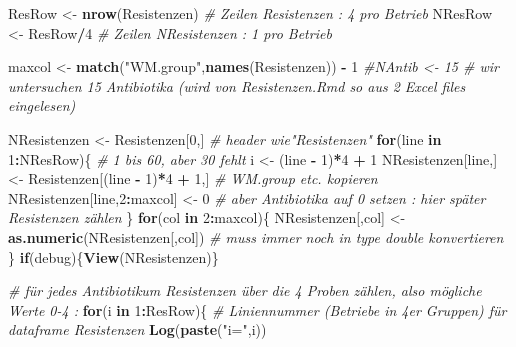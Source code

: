 \documentclass[
]{article}
\newenvironment{Shaded}{\begin{snugshade}}{\end{snugshade}}
\newcommand{\CommentTok}[1]{\textcolor[rgb]{0.56,0.35,0.01}{\textit{#1}}}
\newcommand{\ControlFlowTok}[1]{\textcolor[rgb]{0.13,0.29,0.53}{\textbf{#1}}}
\newcommand{\DecValTok}[1]{\textcolor[rgb]{0.00,0.00,0.81}{#1}}
\newcommand{\KeywordTok}[1]{\textcolor[rgb]{0.13,0.29,0.53}{\textbf{#1}}}
\newcommand{\NormalTok}[1]{#1}
\newcommand{\OperatorTok}[1]{\textcolor[rgb]{0.81,0.36,0.00}{\textbf{#1}}}
\newcommand{\StringTok}[1]{\textcolor[rgb]{0.31,0.60,0.02}{#1}}
\begin{document}
\begin{Shaded}
\begin{Highlighting}[]
\NormalTok{ResRow  <-}\StringTok{ }\KeywordTok{nrow}\NormalTok{(Resistenzen)  }\CommentTok{# Zeilen Resistenzen : 4 pro Betrieb}
\NormalTok{NResRow <-}\StringTok{ }\NormalTok{ResRow}\OperatorTok{/}\DecValTok{4}           \CommentTok{# Zeilen NResistenzen : 1 pro Betrieb}

\NormalTok{maxcol <-}\StringTok{ }\KeywordTok{match}\NormalTok{(}\StringTok{"WM.group"}\NormalTok{,}\KeywordTok{names}\NormalTok{(Resistenzen)) }\OperatorTok{-}\StringTok{ }\DecValTok{1}
\CommentTok{#NAntib  <- 15                 # wir untersuchen 15 Antibiotika (wird von Resistenzen.Rmd so aus 2 Excel files eingelesen)}

\NormalTok{NResistenzen <-}\StringTok{ }\NormalTok{Resistenzen[}\DecValTok{0}\NormalTok{,]                          }\CommentTok{# header wie"Resistenzen"}
\ControlFlowTok{for}\NormalTok{(line }\ControlFlowTok{in} \DecValTok{1}\OperatorTok{:}\NormalTok{NResRow)\{                                  }\CommentTok{# 1 bis 60, aber 30 fehlt}
\NormalTok{  i <-}\StringTok{ }\NormalTok{(line }\OperatorTok{-}\StringTok{ }\DecValTok{1}\NormalTok{)}\OperatorTok{*}\DecValTok{4} \OperatorTok{+}\StringTok{ }\DecValTok{1}
\NormalTok{  NResistenzen[line,] <-}\StringTok{ }\NormalTok{Resistenzen[(line }\OperatorTok{-}\StringTok{ }\DecValTok{1}\NormalTok{)}\OperatorTok{*}\DecValTok{4} \OperatorTok{+}\StringTok{ }\DecValTok{1}\NormalTok{,]  }\CommentTok{# WM.group etc. kopieren}
\NormalTok{  NResistenzen[line,}\DecValTok{2}\OperatorTok{:}\NormalTok{maxcol] <-}\StringTok{ }\DecValTok{0}                       \CommentTok{# aber Antibiotika auf 0 setzen : hier später Resistenzen zählen}
\NormalTok{\}}
\ControlFlowTok{for}\NormalTok{(col }\ControlFlowTok{in} \DecValTok{2}\OperatorTok{:}\NormalTok{maxcol)\{}
\NormalTok{  NResistenzen[,col] <-}\StringTok{  }\KeywordTok{as.numeric}\NormalTok{(NResistenzen[,col])  }\CommentTok{# muss immer noch in type double konvertieren}
\NormalTok{\}}
\ControlFlowTok{if}\NormalTok{(debug)\{}\KeywordTok{View}\NormalTok{(NResistenzen)\} }

\CommentTok{# für jedes Antibiotikum Resistenzen über die 4 Proben zählen, also mögliche Werte 0-4 :}
\ControlFlowTok{for}\NormalTok{(i }\ControlFlowTok{in} \DecValTok{1}\OperatorTok{:}\NormalTok{ResRow)\{                             }\CommentTok{# Liniennummer (Betriebe in 4er Gruppen) für dataframe Resistenzen}
  \KeywordTok{Log}\NormalTok{(}\KeywordTok{paste}\NormalTok{(}\StringTok{"i="}\NormalTok{,i))}
  

\end{Highlighting}
\end{Shaded}
\end{document}
